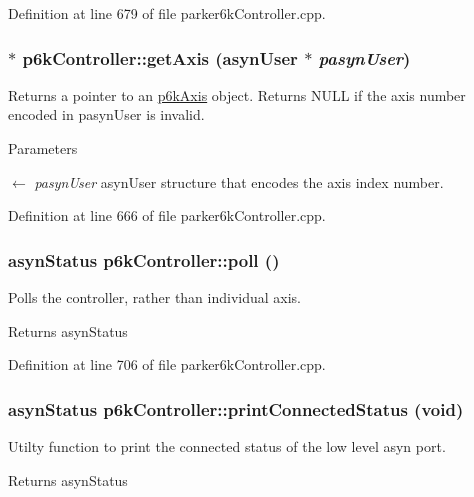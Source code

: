 Definition at line 679 of file parker6kController.cpp.\hypertarget{classp6kController_a0790d66b39dbebbb6265bcabb167e3a5}{
\subsubsection[{getAxis}]{ $\ast$ p6kController::getAxis (asynUser $\ast$ {\em pasynUser})}}
\label{classp6kController_a0790d66b39dbebbb6265bcabb167e3a5}
Returns a pointer to an \hyperlink{classp6kAxis}{p6kAxis} object. Returns NULL if the axis number encoded in pasynUser is invalid. 
\begin{DoxyParams}{Parameters}
\item[\mbox{$\leftarrow$} {\em pasynUser}]asynUser structure that encodes the axis index number. \end{DoxyParams}


Definition at line 666 of file parker6kController.cpp.\hypertarget{classp6kController_abc19f869fb74f3854cd9a664b3e35ded}{
\subsubsection[{poll}]{\setlength{\rightskip}{0pt plus 5cm}asynStatus p6kController::poll ()}}
\label{classp6kController_abc19f869fb74f3854cd9a664b3e35ded}
Polls the controller, rather than individual axis. \begin{DoxyReturn}{Returns}
asynStatus 
\end{DoxyReturn}


Definition at line 706 of file parker6kController.cpp.\hypertarget{classp6kController_a5089092687d5a2ebaf54d5a06d23a185}{
\subsubsection[{printConnectedStatus}]{\setlength{\rightskip}{0pt plus 5cm}asynStatus p6kController::printConnectedStatus (void)}}
\label{classp6kController_a5089092687d5a2ebaf54d5a06d23a185}
Utilty function to print the connected status of the low level asyn port. \begin{DoxyReturn}{Returns}
asynStatus 
\end{DoxyReturn}


